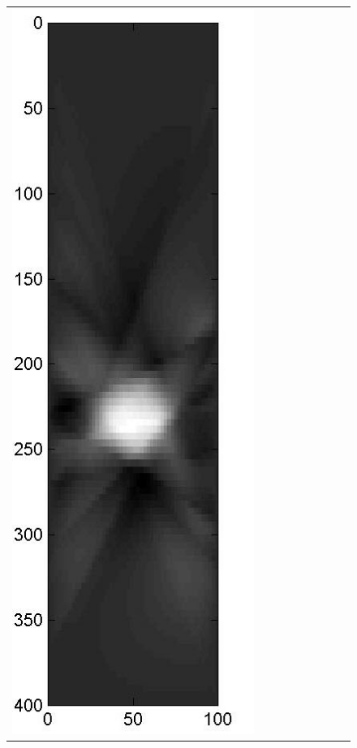 \documentclass[english]{siamltex}
\begin{document}
{\begin{figure}[!h]
\begin{center}
\begin{tabular}{|c|c|c|c|c|c|c|c|c|}
			\includegraphics[width=.9\iwidth]{figures/newFigs/noisy/resultsExp-5-mk}
			&

\end{tabular}
\end{center}
\end{figure}}
\end{document}
